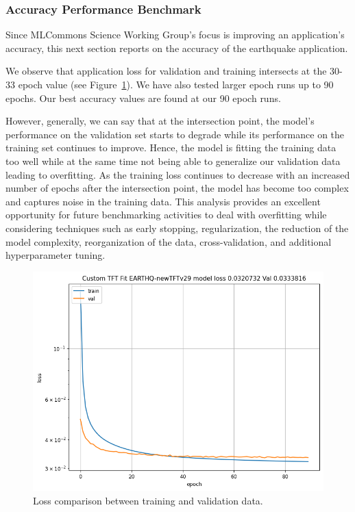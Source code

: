 \documentclass[utf8]{FrontiersinVancouver} %
\begin{document}
\subsubsection{Accuracy Performance Benchmark}
\label{sec:perf-accuracy}

Since MLCommons Science Working Group's focus is improving an application’s accuracy, this next section reports on the accuracy of the earthquake application.

We observe that application loss for validation and training intersects at the 30-33 epoch value (see Figure~\ref{fig:loss}). We have also tested larger epoch runs up to 90 epochs. Our best accuracy values are found at our 90 epoch runs.

However, generally, we can say that at the intersection point, the model's performance on the validation set starts to degrade while its performance on the training set continues to improve. Hence, the  model is fitting the training data too well while at the same time not being able to generalize our validation data leading to overfitting. As the training loss continues to decrease with an increased number of epochs after the intersection point, the model has become too complex and captures noise in the training data. This analysis provides an excellent opportunity for future benchmarking activities to deal with overfitting while considering techniques such as early stopping, regularization, the reduction of the model complexity, reorganization of the data, cross-validation, and additional hyperparameter tuning. 

\begin{figure}[htb]
    \centering
    \includegraphics[width=0.70\columnwidth]{images/loss90.png}
    \caption{Loss comparison between training and validation data.}
    \label{fig:loss}
\end{figure}
\end{document}
